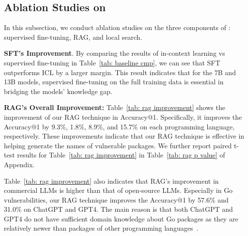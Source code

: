 \subsection{Ablation Studies on \detector{}}
In this subsection, we conduct ablation studies on the three components of \detector{}: supervised fine-tuning, RAG, and local search.

\noindent \textbf{SFT's Improvement}. By comparing the results of in-context learning vs supervised fine-tuning in Table~\ref{tab: baseline cmp}, we can see that SFT outperforms ICL by a larger margin.
This result indicates that for the 7B and 13B models, supervised fine-tuning on the full training data is essential in bridging the models' knowledge gap. 


\noindent \textbf{RAG's Overall Improvement:}
Table~\ref{tab: rag improvement} shows the improvement of our RAG technique in Accuracy@1.
Specifically, it improves the Accuracy@1 by 9.3\%, 1.8\%, 8.9\%, and 15.7\% on each programming language, respectively.
These improvements indicate that our RAG technique is effective in helping generate the names of vulnerable packages. 
We further report paired t-test results for Table~\ref{tab: rag improvement} in Table~\ref{tab: rag p value} of Appendix. 

Table~\ref{tab: rag improvement} also indicates that RAG's improvement in commercial LLMs is higher than that of open-source LLMs.
Especially in Go vulnerabilities, our RAG technique improves the Accuracy@1 by 57.6\% and 31.0\% on ChatGPT and GPT4.
The main reason is that both ChatGPT and GPT4 do not have sufficient domain knowledge about Go packages as they are relatively newer than packages of other programming languages~\cite{chatgpt_golang}. 

